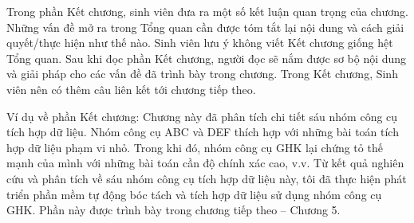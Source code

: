 \documentclass[../main.tex]{subfiles}
\begin{document}
Trong phần Kết chương, sinh viên đưa ra một số kết luận quan trọng của chương. Những vấn đề mở ra trong Tổng quan cần được tóm tắt lại nội dung và cách giải quyết/thực hiện như thế nào. Sinh viên lưu ý không viết Kết chương giống hệt Tổng quan. Sau khi đọc phần Kết chương, người đọc sẽ nắm được sơ bộ nội dung và giải pháp cho các vấn đề đã trình bày trong chương. Trong Kết chương, Sinh viên nên có thêm câu liên kết tới chương tiếp theo.

Ví dụ về phần Kết chương: Chương này đã phân tích chi tiết sáu nhóm công cụ tích hợp dữ liệu. Nhóm công cụ ABC và DEF thích hợp với những bài toán tích hợp dữ liệu phạm vi nhỏ. Trong khi đó, nhóm công cụ GHK lại chứng tỏ thế mạnh của mình với những bài toán cần độ chính xác cao, v.v. Từ kết quả nghiên cứu và phân tích về sáu nhóm công cụ tích hợp dữ liệu này, tôi đã thực hiện phát triển phần mềm tự động bóc tách và tích hợp dữ liệu sử dụng nhóm công cụ GHK. Phần này được trình bày trong chương tiếp theo – Chương 5.
\end{document}
